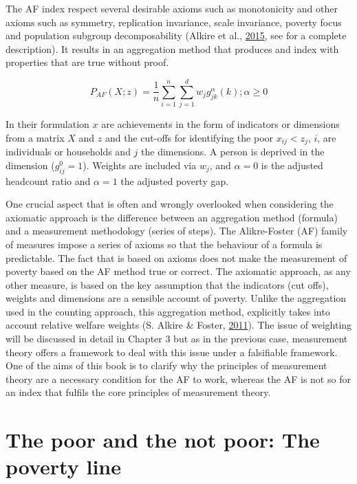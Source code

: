 \documentclass[]{book}
\begin{document}
The AF index respect several desirable axioms such as monotonicity and other axioms such as symmetry, replication invariance, scale invariance, poverty focus and population subgroup decomposability (Alkire et al., \protect\hyperlink{ref-Alkire2015}{2015}, see for a complete description). It results in an aggregation method that produces and index with properties that are true without proof.

\[
P_{AF}(X;z)= \frac{1}{n}\sum _{i=1}^{n}\sum _{j=1}^{d}w_{j}g^{\alpha }_{jk}(k);\alpha\geq0
\]

In their formulation \(x\) are achievements in the form of indicators or dimensions from a matrix \(X\) and \(z\) and the cut-offs for identifying the poor \(x_{ij}<z_j\), \(i\), are individuals or households and \(j\) the dimensions. A person is deprived in the dimension (\(g^{0}_{ij}=1\)). Weights are included via \(w_j\), and \(\alpha=0\) is the adjusted headcount ratio and \(\alpha=1\) the adjusted poverty gap.

One crucial aspect that is often and wrongly overlooked when considering the axiomatic approach is the difference between an aggregation method (formula) and a measurement methodology (series of steps). The Alikre-Foster (AF) family of measures impose a series of axioms so that the behaviour of a formula is predictable. The fact that is based on axioms does not make the measurement of poverty based on the AF method true or correct. The axiomatic approach, as any other measure, is based on the key assumption that the indicators (cut offs), weights and dimensions are a sensible account of poverty. Unlike the aggregation used in the counting approach, this aggregation method, explicitly takes into account relative welfare weights (S. Alkire \& Foster, \protect\hyperlink{ref-Alkire2011a}{2011}). The issue of weighting will be discussed in detail in Chapter 3 but as in the previous case, measurement theory offers a framework to deal with this issue under a falsifiable framework. One of the aims of this book is to clarify why the principles of measurement theory are a necessary condition for the AF to work, whereas the AF is not so for an index that fulfils the core principles of measurement theory.

\hypertarget{the-poor-and-the-not-poor-the-poverty-line}{%
\section{The poor and the not poor: The poverty line}\label{the-poor-and-the-not-poor-the-poverty-line}}
\end{document}
